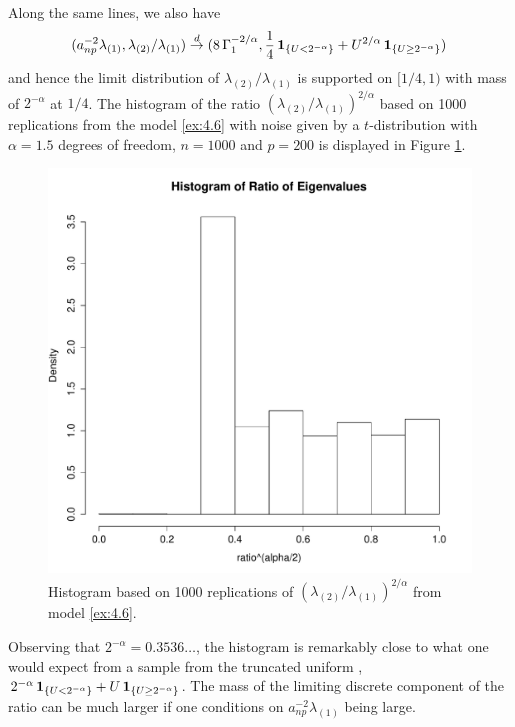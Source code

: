 \begin{example}
Along the same lines, we also have
\begin{equation*}
(a_{np}^{-2}\lambda_{(1)},\lambda_{(2)}/\lambda_{(1)}) \stackrel{d}{\rightarrow}(
8\,\Gamma_1^{-2/\alpha},\frac{1}{4}\,\mathbf{1}_{\{U<2^{-\alpha}\}}+U^{2/\alpha}\,\mathbf{1}_{\{U\ge
  2^{-\alpha}\}})\,
\end{equation*}
and hence the limit distribution of $\lambda_{(2)}/\lambda_{(1)}$ is supported on $[1/4,1)$ with  mass of $2^{-\alpha}$ at $1/4$.  The histogram of the ratio $\left(\lambda_{(2)}/\lambda_{(1)}\right)^{2/\alpha}$ based on 1000 replications from the model \eqref{ex:4.6} with noise given by a $t$-distribution with $\alpha=1.5$ degrees of freedom, $n=1000$ and $p=200$ is displayed in Figure \ref{fig:Davis1}.
\begin{figure} [h]
\begin{center}
\includegraphics[scale=.35]{histogram.pdf}
\end{center}
\caption{Histogram based on 1000 replications of $\left(\lambda_{(2)}/\lambda_{(1)}\right)^{2/\alpha}$ from model \eqref{ex:4.6}.}
\label{fig:Davis1}
\end{figure} Observing that $2^{-\alpha}=0.3536\ldots$,
the histogram is remarkably close to what one would expect from a sample from the truncated
uniform \ds , $2^{-\alpha}\, \mathbf{1}_{\{U<2^{-\alpha}\}}+U\, \mathbf{1}_{\{U\ge 2^{-\alpha} \}}$.
The mass of the limiting discrete component of the ratio can be much
larger if one conditions on $a_{np}^{-2}\lambda_{(1)}$ being large.

\end{example}
